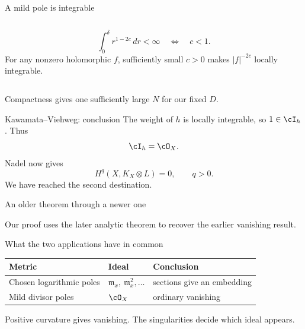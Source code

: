 \begin{frame}{A mild pole is integrable}
\begin{columns}[c]
\centering
{}
\[
\int_0^\delta r^{1-2c}\,dr<\infty
\quad\Longleftrightarrow\quad c<1.
\]
For any nonzero holomorphic \(f\), sufficiently small \(c>0\) makes \(|f|^{-2c}\) locally integrable.
\end{columns}
\medskip
Compactness gives one sufficiently large \(N\) for our fixed \(D\).
\end{frame}

\begin{frame}{Kawamata--Viehweg: conclusion}
The weight of \(h\) is locally integrable, so \(1\in\cI_h\).
Thus
\[
\cI_h=\cO_X.
\]
Nadel now gives
\[
\boxed{H^q(X,K_X\otimes L)=0,\qquad q>0.}
\]
We have reached the second destination.
\end{frame}

\begin{frame}{An older theorem through a newer one}
\begin{center}
\end{center}
\par\bigskip
Our proof uses the later analytic theorem to recover the earlier vanishing result.
\end{frame}

\begin{frame}{What the two applications have in common}
\begin{center}
\renewcommand{\arraystretch}{1.8}
\begin{tabular}{lll}
Metric & Ideal & Conclusion\\
\hline
Chosen logarithmic poles & \(\mathfrak m_x,\ \mathfrak m_x^2,\ldots\) & sections give an embedding\\
Mild divisor poles & \(\cO_X\) & ordinary vanishing
\end{tabular}
\end{center}
\par\bigskip
Positive curvature gives vanishing.
The singularities decide which ideal appears.
\end{frame}

